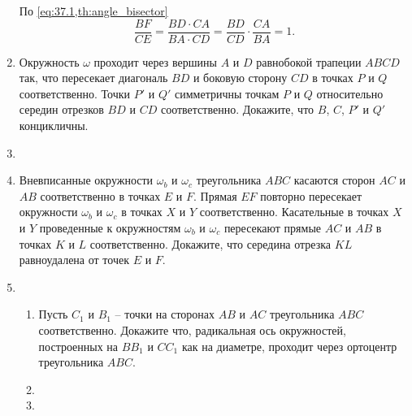 \begin{enumerate}[resume*]
{            По \cref{eq:37.1,th:angle_bisector}
            \begin{equation}
                \frac{BF}{CE} = \frac{BD \cdot CA}{BA \cdot CD} = \frac{BD}{CD} \cdot \frac{CA}{BA} = 1
            .\end{equation} 
        }

    \item Окружность $\omega$ проходит через вершины $A$ и $D$ равнобокой трапеции $ABCD$ так, что пересекает диагональ $BD$ и боковую сторону $CD$ в точках $P$ и $Q$ соответственно. Точки $P'$ и $Q'$ симметричны точкам $P$ и $Q$ относительно середин отрезков $BD$ и $CD$ соответственно. Докажите, что $B$, $C$, $P'$ и $Q'$ концикличны. \wishlisted

    \item {} 

    \item Вневписанные окружности $\omega_b$ и $\omega_c$ треугольника $ABC$ касаются сторон $AC$ и $AB$ соответственно в точках $E$ и $F$. Прямая $EF$ повторно пересекает окружности $\omega_b$ и $\omega_c$ в точках $X$ и $Y$ соответственно. Касательные в точках $X$ и $Y$ проведенные к окружностям $\omega_b$ и $\omega_c$ пересекают прямые $AC$ и $AB$ в точках $K$ и $L$ соответственно. Докажите, что середина отрезка $KL$ равноудалена от точек $E$ и $F$.

    \item \begin{enumerate}
        \item Пусть $C_1$ и $B_1$  -- точки на сторонах $AB$ и $AC$ треугольника $ABC$ соответственно. Докажите что, радикальная ось окружностей, построенных на $BB_1$ и $CC_1$ как на диаметре, проходит через ортоцентр треугольника $ABC$. \wishlisted

        \item {}

        \item {}


\end{enumerate}
\end{enumerate}
